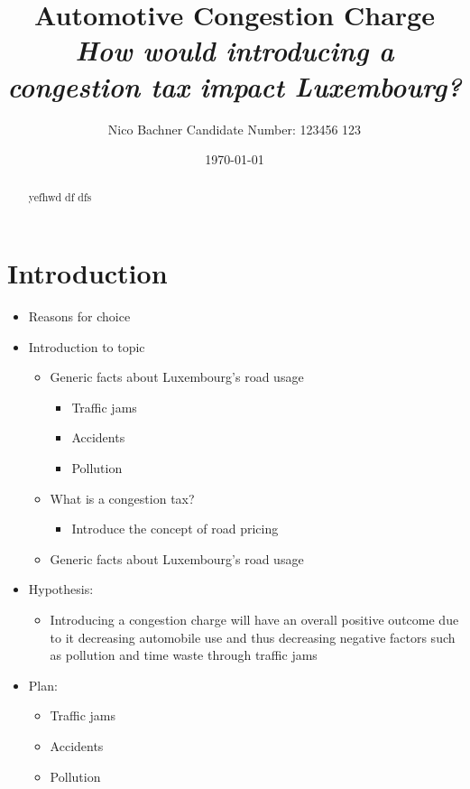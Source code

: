 \documentclass[
      a4paper,
        12pt,
          oneside,
      ]{article}
\title{
    \textbf{Automotive Congestion Charge}\\
    \emph{How would introducing a congestion tax impact Luxembourg?}
      }
\author{
          Nico Bachner \textbar{} Candidate Number: 123456 123
        }
\date{\today}
\providecommand{\tightlist}{
  \setlength{\itemsep}{0pt}
  \setlength{\parskip}{0pt}
}
\begin{document}
\maketitle

  \begin{abstract}
    yefhwd df dfs
  \end{abstract}

      \setcounter{tocdepth}{3}
    \tableofcontents



\hypertarget{introduction}{%
\section{Introduction}\label{introduction}}

\begin{itemize}
\tightlist
\item
  Reasons for choice
\item
  Introduction to topic

  \begin{itemize}
  \tightlist
  \item
    Generic facts about Luxembourg's road usage

    \begin{itemize}
    \tightlist
    \item
      Traffic jams
    \item
      Accidents
    \item
      Pollution
    \end{itemize}
  \item
    What is a congestion tax?

    \begin{itemize}
    \tightlist
    \item
      Introduce the concept of road pricing
    \end{itemize}
  \item
    Generic facts about Luxembourg's road usage
  \end{itemize}
\item
  Hypothesis:

  \begin{itemize}
  \tightlist
  \item
    Introducing a congestion charge will have an overall positive
    outcome due to it decreasing automobile use and thus decreasing
    negative factors such as pollution and time waste through traffic
    jams
  \end{itemize}
\item
  Plan:

  \begin{itemize}
  \tightlist
  \item
    Traffic jams
  \item
    Accidents
  \item
    Pollution
  \end{itemize}
\end{itemize}
\end{document}
